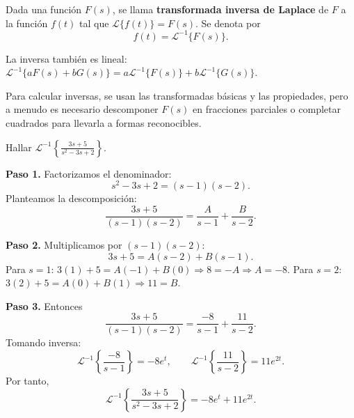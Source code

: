 \begin{definition}
Dada una función $F(s)$, se llama \textbf{transformada inversa de Laplace} de $F$ a la función $f(t)$ tal que $\mathcal{L}\{f(t)\}=F(s)$. Se denota por
\[
f(t) = \mathcal{L}^{-1}\{F(s)\}.
\]
\end{definition}

La inversa también es lineal: $\mathcal{L}^{-1}\{aF(s)+bG(s)\}=a\mathcal{L}^{-1}\{F(s)\}+b\mathcal{L}^{-1}\{G(s)\}$.

Para calcular inversas, se usan las transformadas básicas y las propiedades, pero a menudo es necesario descomponer $F(s)$ en fracciones parciales o completar cuadrados para llevarla a formas reconocibles.

\begin{example}
Hallar $\mathcal{L}^{-1}\left\{\frac{3s+5}{s^2-3s+2}\right\}$.
\begin{myproof}
\textbf{Paso 1.} Factorizamos el denominador:
\[
s^2-3s+2 = (s-1)(s-2).
\]
Planteamos la descomposición:
\[
\frac{3s+5}{(s-1)(s-2)} = \frac{A}{s-1} + \frac{B}{s-2}.
\]

\textbf{Paso 2.} Multiplicamos por $(s-1)(s-2)$:
\[
3s+5 = A(s-2)+B(s-1).
\]
Para $s=1$: $3(1)+5 = A(-1) + B(0) \Rightarrow 8 = -A \Rightarrow A=-8$.
Para $s=2$: $3(2)+5 = A(0) + B(1) \Rightarrow 11 = B$.

\textbf{Paso 3.} Entonces
\[
\frac{3s+5}{(s-1)(s-2)} = \frac{-8}{s-1} + \frac{11}{s-2}.
\]
Tomando inversa:
\[
\mathcal{L}^{-1}\left\{\frac{-8}{s-1}\right\} = -8 e^{t},\qquad \mathcal{L}^{-1}\left\{\frac{11}{s-2}\right\}=11 e^{2t}.
\]
Por tanto,
\[
\boxed{\mathcal{L}^{-1}\left\{\frac{3s+5}{s^2-3s+2}\right\} = -8e^{t} + 11e^{2t}.}
\]
\end{myproof}
\end{example}

